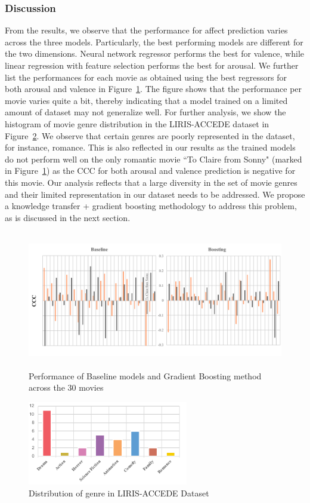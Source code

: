 \documentclass{article}
\begin{document}
\subsubsection{Discussion} From the results, we observe that the performance for affect prediction varies across the three models.
Particularly, the best performing models are different for the two dimensions.
Neural network regressor performs the best for valence, while linear regression with feature selection performs the best for arousal.
We further list the performances for each movie as obtained using the best regressors for both arousal and valence in Figure~\ref{comparison}. 
The figure shows that the performance per movie varies quite a bit, thereby indicating that a model trained on a limited amount of dataset may not generalize well.
For further analysis, we show the histogram of movie genre distribution in the LIRIS-ACCEDE dataset in Figure~\ref{genre}.
We observe that certain genres are poorly represented in the dataset, for instance, romance.
This is also reflected in our results as the trained models do not perform well on the only romantic movie ``To Claire from Sonny" (marked in Figure~\ref{comparison}) as the CCC for both arousal and valence prediction is negative for this movie. 
Our analysis reflects that a large diversity in the set of movie genres and their limited representation in our dataset needs to be addressed.
We propose a knowledge transfer + gradient boosting methodology to address this problem, as is discussed in the next section.


\begin{figure}[t]
\includegraphics[width=\textwidth, height = 6cm]{images/comparison2.pdf}
\centering
\caption{Performance of Baseline models and Gradient Boosting method across the 30 movies}
\label{comparison}
\end{figure}

\begin{figure}[t]
\includegraphics[width=7cm]{genre2}
\centering
\caption{Distribution of genre in LIRIS-ACCEDE Dataset}
\label{genre}
\end{figure}
\end{document}
